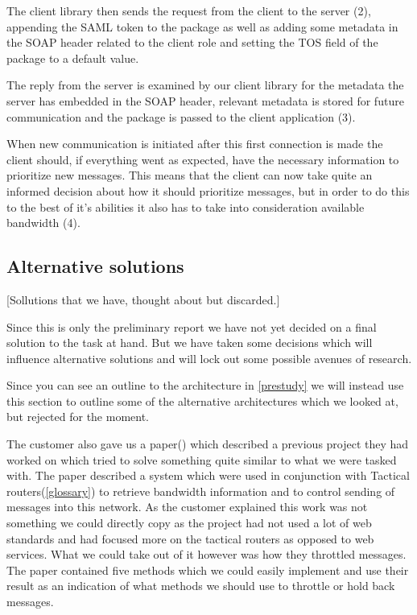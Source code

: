 \documentclass[12pt]{article}
\begin{document}
        The client library then sends the request from the client to the server (2), appending the SAML token to the package as well as adding some metadata in the SOAP header related to the client role and setting the TOS field of the package to a default value.

        The reply from the server is examined by our client library for the metadata the server has embedded in the SOAP header, relevant metadata is stored for future communication and the package is passed to the client application (3).

        When new communication is initiated after this first connection is made the client should, if everything went as expected, have the necessary information to prioritize new messages. This means that the client can now take quite an informed decision about how it should prioritize messages, but in order to do this to the best of it’s abilities it also has to take into consideration available bandwidth (4).
    
           
    \subsection{Alternative solutions}\label{alternativesolutions} [Sollutions that we have, thought about but discarded.]
    
        Since this is only the preliminary report we have not yet decided on a final solution to the task at hand. But we have taken some decisions which will influence alternative solutions and will lock out some possible avenues of research.

        Since you can see an outline to the architecture in \ref{prestudy} we will instead use this section to outline some of the alternative architectures which we looked at, but rejected for the moment.

        The customer also gave us a paper(\cite{soa-qos-pdf}) which described a previous project they had worked on which tried to solve something quite similar to what we were tasked with. The paper described a system which were used in conjunction with Tactical routers(\ref{glossary}) to retrieve bandwidth information and to control sending of messages into this network. As the customer explained this work was not something we could directly copy as the project had not used a lot of web standards and had focused more on the tactical routers as opposed to web services. What we could take out of it however was how they throttled messages. The paper contained five methods which we could easily implement and use their result as an indication of what methods we should use to throttle or hold back messages.
\end{document}
